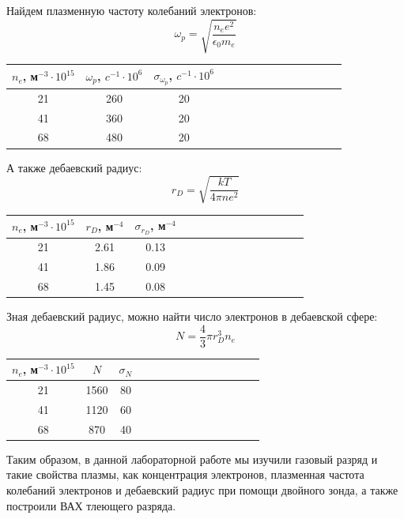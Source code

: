 \documentclass[14pt]{article}
\begin{document}
\newpage
Найдем плазменную частоту колебаний электронов:
$$
	\omega_p = \sqrt{\frac{n_ee^2}{\epsilon_0m_e}}
$$

\begin{center}
\begin{tabular}{|c|c|c|c|c|c|c|c|c|c|c|c|c|c|}
\hline
$n_e$, м$^{-3}\cdot10^{15}$	&	$\omega_p$, $c^{-1}\cdot 10^6$	&	$\sigma_{\omega_p}$, $c^{-1}\cdot 10^6$	\\
\hline
21							&	260								&	20											\\
\hline
41							&	360								&	20 											\\
\hline
68							&	480								&	20											\\
\hline
\end{tabular}
\end{center}

\vspace{1cm}
А также дебаевский радиус:
$$
	r_D = \sqrt{\frac{kT}{4\pi ne^2}}
$$

\begin{center}
\begin{tabular}{|c|c|c|c|c|c|c|c|c|c|c|c|c|c|}
\hline
$n_e$, м$^{-3}\cdot10^{15}$	&	$r_D$, м$^{-4}$		&	$\sigma_{r_D}$, м$^{-4}$	\\
\hline
21							&	2.61				&	0.13						\\
\hline
41							&	1.86				&	0.09						\\
\hline
68							&	1.45				&	0.08						\\
\hline
\end{tabular}
\end{center}

\vspace{1cm}
Зная дебаевский радиус, можно найти число электронов в дебаевской сфере:
$$
	N = \frac{4}{3}\pi r_D^3 n_e
$$

\begin{center}
\begin{tabular}{|c|c|c|c|c|c|c|c|c|c|c|c|c|c|}
\hline
$n_e$, м$^{-3}\cdot10^{15}$	&	$N$		&	$\sigma_N$	\\
\hline
21							&	1560	&	80			\\
\hline
41							&	1120	&	60			\\
\hline
68							&	870		&	40			\\
\hline
\end{tabular}
\end{center}

\newpage
Таким образом, в данной лабораторной работе мы изучили газовый разряд и такие свойства плазмы, как концентрация электронов, плазменная частота колебаний электронов и дебаевский радиус при помощи двойного зонда, а также построили ВАХ тлеющего разряда.
\end{document}
